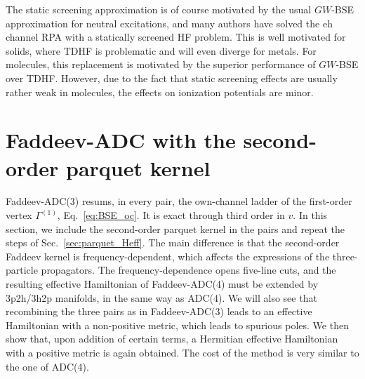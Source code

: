 \documentclass[aip,jcp,reprint,noshowkeys,superscriptaddress]{revtex4-1}
\newcommand{\eh}{\text{eh}}
\begin{document}
The static screening approximation is of course motivated by the 
usual $GW$-BSE approximation for neutral excitations, and many authors
have solved the $\eh$ channel RPA with a statically screened HF problem.
\cite{Cunningham2018,Cunningham2023,Bruneval2024,Forster2025,Patterson2024,Pavlyukh2026} 
This is well motivated for solids, where TDHF is problematic and will even diverge for metals.
For molecules, this replacement is motivated by the superior performance of
$GW$-BSE over TDHF. However, due to the fact that static screening effects are usually rather weak in molecules,
the effects on ionization potentials are minor.\cite{Forster2024,Keizer2026}

\section{\label{sec:second_order}Faddeev-ADC with the second-order parquet kernel}
Faddeev-ADC(3) resums, in every pair, the own-channel ladder of the
first-order vertex $\Gamma^{(1)}$, Eq.~\eqref{eq:BSE_oc}. It is exact
through third order in $v$. In this section, we include
the second-order parquet kernel in the pairs and repeat the steps of
Sec.~\ref{sec:parquet_Heff}. The main difference is that the second-order 
Faddeev kernel is frequency-dependent, which affects the expressions 
of the three-particle propagators. The frequency-dependence opens five-line 
cuts, and the resulting effective Hamiltonian of Faddeev-ADC(4) must be extended
by 3p2h/3h2p manifolds, in the same way as ADC(4). We will also see that recombining the
three pairs as in Faddeev-ADC(3) leads to an effective
Hamiltonian with a non-positive metric, which leads to spurious poles. 
We then show that, upon addition of certain terms,
a Hermitian effective Hamiltonian with a positive metric is again obtained. 
The cost of the method is very similar to the one of ADC(4).
\end{document}
